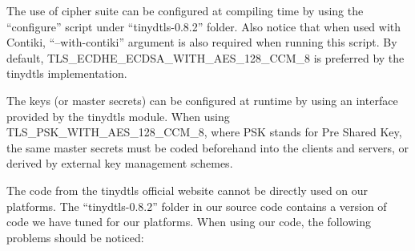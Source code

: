 The use of cipher suite can be configured at compiling time by using the ``configure'' script under ``tinydtls-0.8.2'' folder. Also notice that when used with Contiki, ``--with-contiki'' argument is also required when running this script. By default, TLS\_ECDHE\_ECDSA\_WITH\_AES\_128\_CCM\_8 is preferred by the tinydtls implementation.

The keys (or master secrets) can be configured at runtime by using an interface provided by the tinydtls module. When using TLS\_PSK\_WITH\_AES\_128\_CCM\_8, where PSK stands for Pre Shared Key, the same master secrets must be coded beforehand into the clients and servers, or derived by external key management schemes.

The code from the tinydtls official website cannot be directly used on our platforms. The ``tinydtls-0.8.2'' folder in our source code contains a version of code we have tuned for our platforms. When using our code, the following problems should be noticed:


